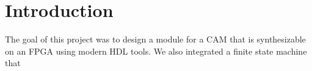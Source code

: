 \section{Introduction}
The goal of this project was to design a module for a CAM that is synthesizable on an FPGA using modern HDL tools. 
We also integrated a finite state machine that 
